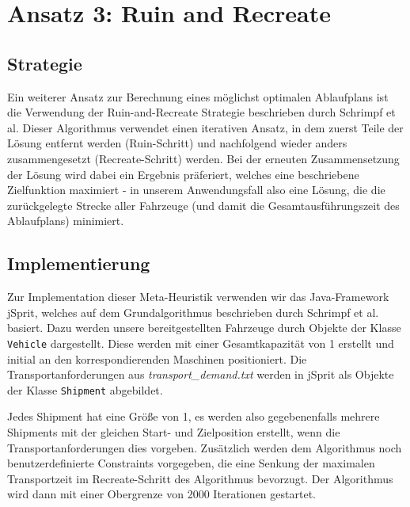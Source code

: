 \documentclass[ngerman]{tudscrreprt}
\newcommand{\code}[1]{\texttt{#1}}
\begin{document}
\section{Ansatz 3: Ruin and Recreate}
\subsection{Strategie}
Ein weiterer Ansatz zur Berechnung eines möglichst optimalen Ablaufplans ist die Verwendung der Ruin-and-Recreate Strategie beschrieben durch Schrimpf et al. \cite{schrimpf} Dieser Algorithmus verwendet einen iterativen Ansatz, in dem zuerst Teile der Lösung entfernt werden (Ruin-Schritt) und nachfolgend wieder anders zusammengesetzt (Recreate-Schritt) werden. Bei der erneuten Zusammensetzung der Lösung wird dabei ein Ergebnis präferiert, welches eine beschriebene Zielfunktion maximiert - in unserem Anwendungsfall also eine Lösung, die die zurückgelegte Strecke aller Fahrzeuge (und damit die Gesamtausführungszeit des Ablaufplans) minimiert.

\subsection{Implementierung}
Zur Implementation dieser Meta-Heuristik verwenden wir das Java-Framework jSprit, welches auf dem Grundalgorithmus beschrieben durch Schrimpf et al. basiert. Dazu werden unsere bereitgestellten Fahrzeuge durch Objekte der Klasse \code{Vehicle} dargestellt. Diese werden mit einer Gesamtkapazität von 1 erstellt und initial an den korrespondierenden Maschinen positioniert. Die Transportanforderungen aus \emph{transport\_demand.txt} werden in jSprit als Objekte der Klasse \code{Shipment} abgebildet.

Jedes Shipment hat eine Größe von 1, es werden also gegebenenfalls mehrere Shipments mit der gleichen Start- und Zielposition erstellt, wenn die Transportanforderungen dies vorgeben. Zusätzlich werden dem Algorithmus noch benutzerdefinierte Constraints vorgegeben, die eine Senkung der maximalen Transportzeit im Recreate-Schritt des Algorithmus bevorzugt. Der Algorithmus wird dann mit einer Obergrenze von \num{2000} Iterationen gestartet.
\end{document}
